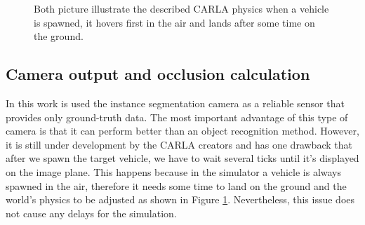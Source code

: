 \begin{figure} [h!]
  \centering
  \hfill
  \caption[Spawning a vehicle]{Both picture illustrate the described CARLA physics when a vehicle is spawned, it hovers first in the air and lands after some time on the ground.} \label{fig:spawn_vehicle}
\end{figure}

 \subsection{Camera output and occlusion calculation} \label{subsec:calc_occl}
 In this work is used the instance segmentation camera as a reliable sensor that provides only ground-truth data. The most important advantage of this type of camera is that it can perform better than an object recognition method. However, it is still under development by the CARLA creators and has one drawback that after we spawn the target vehicle, we have to wait several ticks until it's displayed on the image plane. This happens because in the simulator a vehicle is always spawned in the air, therefore it needs some time to land on the ground and the world's physics to be adjusted as shown in Figure \ref{fig:spawn_vehicle}. Nevertheless, this issue does not cause any delays for the simulation.
 
